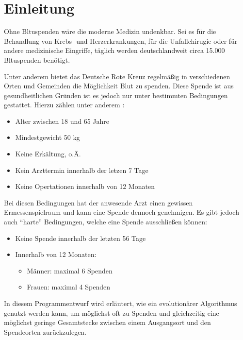 \section{Einleitung}\label{sec:einleitung}
Ohne Bltuspenden wäre die moderne Medizin undenkbar.
Sei es für die Behandlung von Krebs- und Herzerkrankungen,
für die Unfallchirugie oder für andere medizinische Eingriffe,
täglich werden deutschlandweit circa 15.000 Bltuspenden benötigt. \cite{FragenAn98:online}

Unter anderem bietet das Deutsche Rote Kreuz regelmäßig in verschiedenen Orten und Gemeinden die Möglichkeit Blut zu spenden.
Diese Spende ist aus gesundheitlichen Gründen ist es jedoch nur unter bestimmten Bedingungen gestattet.
Hierzu zählen unter anderem \cite{SpendeCh65:online}:
\begin{itemize}
    \setlength\itemsep{-0.5em}
    \item Alter zwischen 18 und 65 Jahre
    \item Mindestgewicht 50 kg
    \item Keine Erkältung, o.Ä.
    \item Kein Arzttermin innerhalb der letzen 7 Tage
    \item Keine Opertationen innerhalb von 12 Monaten
\end{itemize}

Bei diesen Bedingungen hat der anwesende Arzt einen gewissen Ermessenspielraum und kann eine Spende dennoch genehmigen.
Es gibt jedoch auch \enquote{harte} Bedingungen, welche eine Spende ausschließen können:

\begin{itemize}
    \setlength\itemsep{-0.5em}
    \item Keine Spende innerhalb der letzten 56 Tage
    \item Innerhalb von 12 Monaten: \begin{itemize}
        \vspace{-1em}
        \setlength\itemsep{-0.5em}
        \item Männer:  maximal 6 Spenden
        \item Frauen:  maximal 4 Spenden
    \end{itemize}
\end{itemize}

In diesem Programmentwurf wird erläutert,
wie ein evolutionärer Algorithmus genutzt werden kann,
um möglichst oft zu Spenden und
gleichzeitig eine möglichst geringe Gesamtstecke zwischen einem Ausgangsort und den Spendeorten zurückzulegen.
